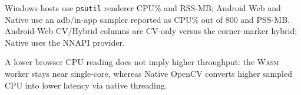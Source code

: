 \documentclass[conference]{IEEEtran}
\newcommand{\wasm}{\textnormal{\textsc{Wasm}}}
\begin{document}
\begin{table}[!htb]
\caption{Resource summary over the $N{=}185$ continuous run. CPU cells
are avg/peak in the instrument's native unit; RAM cells are CV/hybrid peak
MB. Indicative feasibility only; units are not comparable across instruments.}
\label{tab:resources}
\centering
\scriptsize
\setlength{\tabcolsep}{2.5pt}

\vspace{2pt}
\parbox{\columnwidth}{\footnotesize
Windows hosts use \texttt{psutil} renderer CPU\% and RSS-MB; Android Web and
Native use an adb/in-app sampler reported as CPU\% out of $800$ and PSS-MB.
Android-Web CV/Hybrid columns are CV-only versus the corner-marker hybrid;
Native uses the NNAPI provider.}
\end{table}

A lower browser CPU reading does not imply higher throughput: the \wasm{}
worker stays near single-core, whereas Native OpenCV converts higher sampled
CPU into lower latency via native threading.
\end{document}
